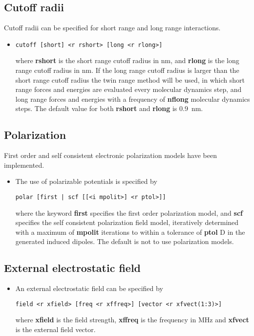 \subsection{Cutoff radii}
Cutoff radii can be specified for short range and long range interactions.
\begin{itemize}
\item
\begin{verbatim}
cutoff [short] <r rshort> [long <r rlong>]
\end{verbatim}
where {\bf rshort} is the short range cutoff radius in nm, and {\bf rlong}
is the long range cutoff radius in nm. If the long range cutoff radius
is larger than the short range cutoff radius the twin range method will
be used, in which short range forces and energies are evaluated every
molecular dynamics step, and long range forces and energies with a
frequency of {\bf nflong} molecular dynamics steps. The default value
for both {\bf rshort} and {\bf rlong} is 0.9~nm.
\end{itemize}
\subsection{Polarization}
First order and self consistent electronic polarization models have
been implemented.
\begin{itemize}
\item
The use of polarizable potentials is specified by
\begin{verbatim}
polar [first | scf [[<i mpolit>] <r ptol>]]
\end{verbatim}
where the keyword {\bf first} specifies the first order polarization
model, and {\bf scf} specifies the self consistent polarization field
model, iteratively determined with a maximum of {\bf mpolit}
iterations to within a tolerance of {\bf ptol} D in the generated
induced dipoles. The default is not to use polarization models.
\end{itemize}
\subsection{External electrostatic field}
\begin{itemize}
\item
An external electrostatic field can be specified by
\begin{verbatim}
field <r xfield> [freq <r xffreq>] [vector <r xfvect(1:3)>]
\end{verbatim}
where {\bf xfield} is the field strength, {\bf xffreq} is the
frequency in MHz and {\bf xfvect} is the external field vector.
\end{itemize}
